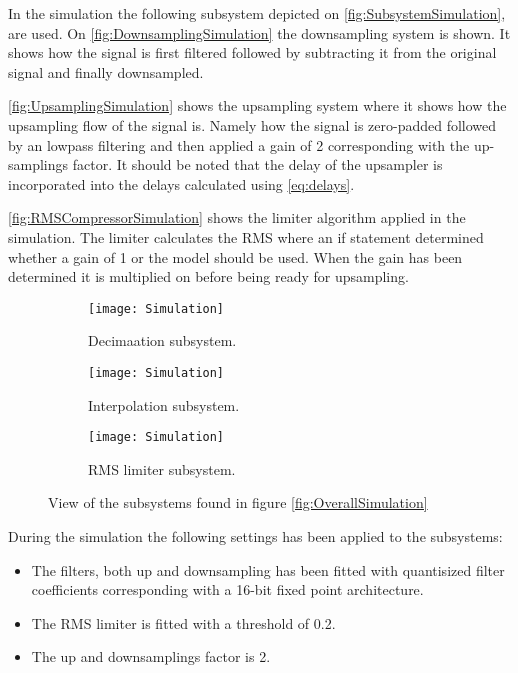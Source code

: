 In the simulation the following subsystem depicted on \autoref{fig:SubsystemSimulation}, are used. On \autoref{fig:DownsamplingSimulation} the downsampling system is shown. It shows how the signal is first filtered followed by subtracting it from the original signal and finally downsampled. 

\autoref{fig:UpsamplingSimulation} shows the upsampling system where it shows how the upsampling flow of the signal is. Namely how the signal is zero-padded followed by an lowpass filtering and then applied a gain of 2 corresponding with the up-samplings factor. It should be noted that the delay of the upsampler is incorporated into the delays calculated using \autoref{eq:delays}.  

\autoref{fig:RMSCompressorSimulation} shows the limiter algorithm applied in the simulation. The limiter calculates the RMS where an if statement determined whether a gain of 1 or the model should be used. When the gain has been determined it is multiplied on before being ready for upsampling. 
\begin{figure}[H]
\centering
\begin{subfigure}[t]{0.49\textwidth}
    \centering
\texttt{[image: Simulation]}
    \caption{Decimaation subsystem.}
    \label{fig:DownsamplingSimulation}
\end{subfigure}
\begin{subfigure}[t]{0.49\textwidth}
    \centering
\texttt{[image: Simulation]}
    \caption{Interpolation subsystem.}
    \label{fig:UpsamplingSimulation}
\end{subfigure}
\begin{subfigure}[t]{\textwidth}
    \centering
\texttt{[image: Simulation]}
    \caption{RMS limiter subsystem.}
    \label{fig:RMSCompressorSimulation}
\end{subfigure}
\label{fig:SubsystemSimulation}
\caption{View of the subsystems found in figure \ref{fig:OverallSimulation}}
\end{figure}


During the simulation the following settings has been applied to the subsystems:
\begin{itemize}
\item The filters, both up and downsampling has been fitted with quantisized filter coefficients corresponding with a 16-bit fixed point architecture.
\item The RMS limiter is fitted with a threshold of 0.2. 
\item The up and downsamplings factor is 2.
\end{itemize}


